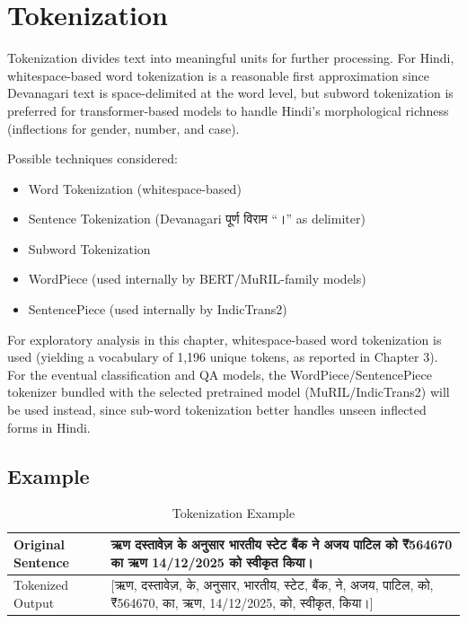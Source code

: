 
\section{Tokenization}

Tokenization divides text into meaningful units for further processing. For Hindi, whitespace-based word tokenization is a reasonable first approximation since Devanagari text is space-delimited at the word level, but subword tokenization is preferred for transformer-based models to handle Hindi's morphological richness (inflections for gender, number, and case).

Possible techniques considered:

\begin{itemize}
\item Word Tokenization (whitespace-based)
\item Sentence Tokenization (Devanagari पूर्ण विराम ``।'' as delimiter)
\item Subword Tokenization
\item WordPiece (used internally by BERT/MuRIL-family models)
\item SentencePiece (used internally by IndicTrans2)
\end{itemize}

For exploratory analysis in this chapter, whitespace-based word tokenization is used (yielding a vocabulary of 1,196 unique tokens, as reported in Chapter 3). For the eventual classification and QA models, the WordPiece/SentencePiece tokenizer bundled with the selected pretrained model (MuRIL/IndicTrans2) will be used instead, since sub-word tokenization better handles unseen inflected forms in Hindi.

\subsection*{Example}

\begin{table}[H]
\centering
\caption{Tokenization Example}

\begin{tabular}{|p{6cm}|p{8cm}|}

\hline

Original Sentence &
ऋण दस्तावेज़ के अनुसार भारतीय स्टेट बैंक ने अजय पाटिल को ₹564670 का ऋण 14/12/2025 को स्वीकृत किया।
\\

\hline

Tokenized Output &
[ऋण, दस्तावेज़, के, अनुसार, भारतीय, स्टेट, बैंक, ने, अजय, पाटिल, को, ₹564670, का, ऋण, 14/12/2025, को, स्वीकृत, किया।]
\\

\hline

\end{tabular}

\end{table}

